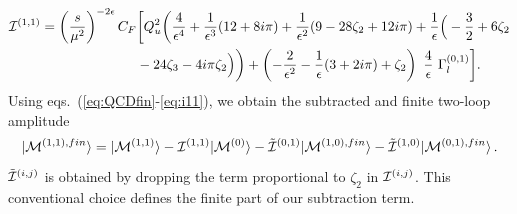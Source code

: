 \documentclass[a4paper]{jpconf}
\begin{document}
%
\begin{align}
  \I^{(1,1)} = \smu^{-2\ep} C_F &
\bigg[
Q_u^2  \bigg( \frac{4}{\ep^4} + \frac{1}{\ep^3} ( 12 + 8 i \pi ) + \frac{1}{\ep^2} ( 9 - 28 \zeta_2 + 12 i \pi)
+ \frac{1}{\ep} \Big( -\frac{3}{2} + 6 \zeta_2
\nonumber\\&
- 24 \zeta_3 - 4 i \pi \zeta_2 \Big) \bigg)
%
+ \left( - \frac{2}{\ep^2} - \frac{1}{\ep} (3 + 2 i \pi)  + \zeta_2 \right)~\frac{4}{\ep}~\Gamma_l^{(0,1)} \bigg].
\label{eq:i11}
\end{align}
% 
Using eqs.~(\ref{eq:QCDfin}-\ref{eq:i11}), we obtain the subtracted and finite two-loop amplitude
%
\begin{equation}
  | \M^{(1,1),fin} \rangle =
  | \M^{(1,1)} \rangle -  \I^{(1,1)} | \M^{(0)} \rangle
                      - \tilde{\I}^{(0,1)} | \M^{(1,0),fin} \rangle
                      - \tilde{\I}^{(1,0)} | \M^{(0,1),fin} \rangle \,.
 \label{eq:subtracted}
\end{equation}
%
%
$\tilde{\I}^{(i,j)}$ is obtained by dropping the term proportional to $\zeta_2$ in ${\I}^{(i,j)}$.
This conventional choice defines the finite part of our subtraction term.
%
\end{document}
